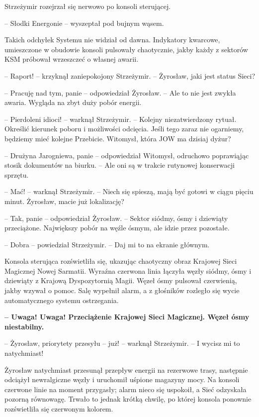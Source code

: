 \sloppy
\noindent Strzeżymir rozejrzał się nerwowo po konsoli sterującej.
\par\noindent-- Słodki Energonie -- wyszeptał pod bujnym wąsem. 
\par\indent Takich odchyłek Systemu nie widział od dawna. Indykatory kwarcowe, umieszczone w obudowie konsoli pulsowały chaotycznie, jakby każdy z sektorów KSM próbował wrzeszczeć o własnej awarii.
\par\noindent-- Raport! -- krzyknął zaniepokojony Strzeżymir. -- Żyrosław, jaki jest status Sieci?
\par\noindent-- Pracuję nad tym, panie -- odpowiedział Żyrosław. -- Ale to nie jest zwykła awaria. Wygląda na zbyt duży pobór energii.
\par\noindent-- Pierdoleni idioci! -- warknął Strzeżymir. -- Kolejny niezatwierdzony rytuał. Określić kierunek poboru i możliwości odcięcia. Jeśli tego zaraz nie ogarniemy, będziemy mieć kolejne Przebicie. Witomysł, która JOW ma dzisiaj dyżur?
\par\noindent-- Drużyna Jarogniewa, panie -- odpowiedział Witomysł, odruchowo poprawiąjąc stosik dokumentów na biurku. -- Ale oni są w trakcie rutynowej konserwacji sprzętu.
\par\noindent-- Mać! -- warknął Strzeżymir. -- Niech się spieszą, mają być gotowi w ciągu pięciu minut. Żyrosław, macie już lokalizację?
\par\noindent-- Tak, panie -- odpowiedział Żyrosław. -- Sektor siódmy, ósmy i dziewiąty przeciążone. Największy pobór na węźle ósmym, ale idzie przez pozostałe. 
\par\noindent-- Dobra -- powiedział Strzeżymir. -- Daj mi to na ekranie głównym.
\par\indent Konsola sterująca rozświetliła się, ukazując chaotyczny obraz Krajowej Sieci Magicznej Nowej Sarmatii. Wyraźna czerwona linia łączyła węzły siódmy, ósmy i dziewiąty z Krajową Dyspozytornią Magii. Węzeł ósmy pulsował czerwienią, jakby wzywał o pomoc. Salę wypełnił alarm, a z głośników rozległo się wycie automatycznego systemu ostrzegania.
\vspace{0.15cm}
\par\noindent\textbf{-- Uwaga! Uwaga! Przeciążenie Krajowej Sieci Magicznej. Węzeł ósmy niestabilny.}
\vspace{0.15cm}
\par\noindent-- Żyrosław, priorytety przesyłu -- już! -- warknął Strzeżymir. -- I wycisz mi to natychmiast! 
\par\indent Żyrosław natychmiast przesunął przepływ energii na rezerwowe trasy, następnie odciążył newralgiczne węzły i uruchomił uśpione magazyny mocy. Na konsoli czerwone linie na moment przygasły; alarm nieco się uspokoił, a Sieć odzyskała pozorną równowagę. Trwało to jednak krótką chwilę, po której konsola ponownie rozświetliła się czerwonym kolorem.
